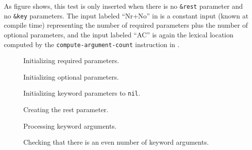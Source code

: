 As figure  shows, this test is only
inserted when there is no \texttt{\&rest} parameter and no
\texttt{\&key} parameters. The input labeled ``Nr+No'' in
 is a constant input (known
at compile time) representing the number of required parameters plus
the number of optional parameters, and the input labeled ``AC'' is
again the lexical location computed by the
\texttt{compute-argument-count} instruction in
.

\begin{figure}
\begin{center}
\end{center}
\caption{\label{fig-initialize-required-parameters}
Initializing required parameters.}
\end{figure}

\begin{figure}
\begin{center}
\end{center}
\caption{\label{fig-initialize-optional-parameters}
Initializing optional parameters.}
\end{figure}

\begin{figure}
\begin{center}
\end{center}
\caption{\label{fig-no-more-arguments}
Initializing keyword parameters to \texttt{nil}.}
\end{figure}

\begin{figure}
\begin{center}
\end{center}
\caption{\label{fig-create-rest-parameter}
Creating the rest parameter.}
\end{figure}

\begin{figure}
\begin{center}
\end{center}
\caption{\label{fig-process-keyword-arguments}
Processing keyword arguments.}
\end{figure}

\begin{figure}
\begin{center}
\end{center}
\caption{\label{fig-check-even-keyword-arguments}
Checking that there is an even number of keyword arguments.}
\end{figure}

